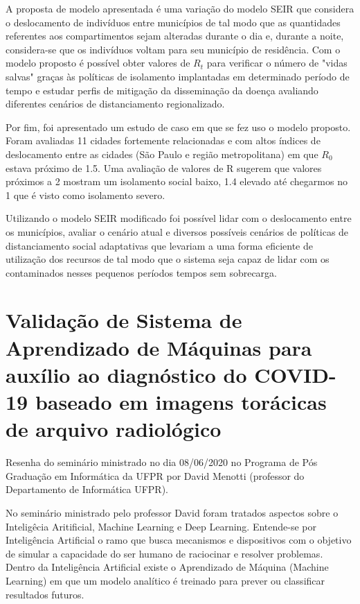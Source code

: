 \documentclass[
	12pt,				%
	openright,			%
	twoside,			%
	a4paper,			%
	english,			%
	brazil,				%
	svgnames
	]{abntex2}\usepackage[]{graphicx}\usepackage[]{color}
\begin{document}
A proposta de modelo apresentada é uma variação do modelo SEIR que considera o deslocamento de indivíduos entre municípios de tal modo que as quantidades referentes aos compartimentos sejam alteradas durante o dia e, durante a noite, considera-se que os indivíduos voltam para seu município de residência. Com o modelo proposto é possível obter valores de $R_t$ para verificar o número de "vidas salvas" graças às políticas de isolamento implantadas em determinado período de tempo e estudar perfis de mitigação da disseminação da doença avaliando diferentes cenários de distanciamento regionalizado.

Por fim, foi apresentado um estudo de caso em que se fez uso o modelo proposto. Foram avaliadas 11 cidades fortemente relacionadas e com altos índices de deslocamento entre as cidades (São Paulo e região metropolitana) em que $R_0$ estava próximo de 1.5. Uma avaliação de valores de R sugerem que valores próximos a 2 mostram um isolamento social baixo, 1.4 elevado até chegarmos no 1 que é visto como isolamento severo. 

Utilizando o modelo SEIR modificado foi possível lidar com o deslocamento entre os municípios, avaliar o cenário atual e diversos possíveis cenários de políticas de distanciamento social adaptativas que levariam a uma forma eficiente de utilização dos recursos de tal modo que o sistema seja capaz de lidar com os contaminados nesses pequenos períodos tempos sem sobrecarga.

\chapter{Validação de Sistema de Aprendizado de Máquinas para auxílio ao diagnóstico do COVID-19 baseado em imagens torácicas de arquivo radiológico}
\label{cap:res8}


Resenha do seminário ministrado no dia 08/06/2020 no Programa de Pós Graduação em Informática da UFPR por David Menotti (professor do Departamento de Informática UFPR).

No seminário ministrado pelo professor David foram tratados aspectos sobre o Inteligêcia Aritificial, Machine Learning e Deep Learning. Entende-se por Inteligência Artificial o ramo que busca mecanismos e dispositivos com o objetivo de simular a capacidade do ser humano de raciocinar e resolver problemas. Dentro da Inteligência Artificial existe o Aprendizado de Máquina (Machine Learning) em que um modelo analítico é treinado para prever ou classificar resultados futuros.
\end{document}
